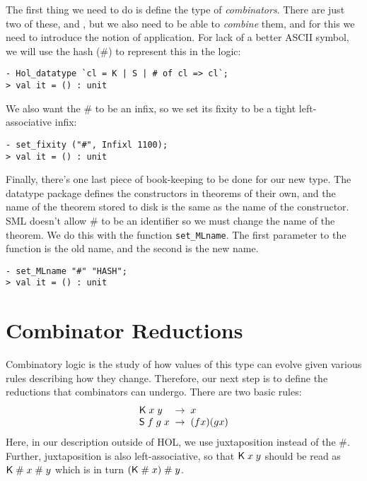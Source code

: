 \documentclass[12pt]{article}
\newcommand{\KC}{\con{K}}
\newcommand{\SC}{\con{S}}
\begin{document}
The first thing we need to do is define the type of
\emph{combinators}.  There are just two of these, \KC{} and \SC, but
we also need to be able to \emph{combine} them, and for this we need
to introduce the notion of application.  For lack of a better ASCII
symbol, we will use the hash (\#) to represent this in the logic:
\begin{session}\begin{verbatim}
- Hol_datatype `cl = K | S | # of cl => cl`;
> val it = () : unit
\end{verbatim}\end{session}
We also want the \# to be an infix, so we set its fixity to be a tight
left-associative infix:
\begin{session}\begin{verbatim}
- set_fixity ("#", Infixl 1100);
> val it = () : unit
\end{verbatim}\end{session}
    Finally, there's one last piece of book-keeping to be done for our
    new type.  The datatype package defines the constructors in
    theorems of their own, and the name of the theorem stored to disk
    is the same as the name of the constructor.  SML doesn't allow \#
    to be an identifier so we must change the name of the theorem.  We
    do this with the function \texttt{set\_MLname}.  The first
    parameter to the function is the old name, and the second is the
    new name.
\begin{session}\begin{verbatim}
- set_MLname "#" "HASH";
> val it = () : unit
\end{verbatim}\end{session}




\section{Combinator Reductions}
\label{sec:Comb-Reduct}

Combinatory logic is the study of how values of this type can evolve
given various rules describing how they change.  Therefore, our next
step is to define the reductions that combinators can undergo.  There
are two basic rules:
\[\begin{array}{l@{\;\;\rightarrow\;\;}l}
\KC\;x\;y & x\\
\SC\;f\;g\;x & (f x)(g x)
\end{array}\]
Here, in our description outside of HOL, we use juxtaposition instead
of the \#.  Further, juxtaposition is also left-associative, so that
${\sf K}\;x\;y$ should be read as ${\sf K}\;\#\;x\;\#\;y$ which is in
turn $({\sf K}\;\#\;x)\;\#\;y$.
\end{document}
